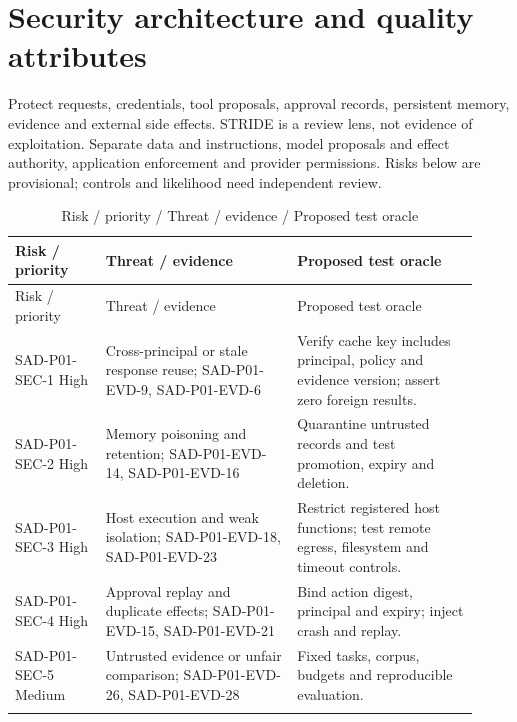 \documentclass[10pt,letterpaper]{article}
\begin{document}
\section{Security architecture and quality attributes}
Protect requests, credentials, tool proposals, approval records, persistent memory, evidence and external side effects. STRIDE is a review lens, not evidence of exploitation. Separate data and instructions, model proposals and effect authority, application enforcement and provider permissions. Risks below are provisional; controls and likelihood need independent review.
\begin{longtable}{@{}>{\raggedright\arraybackslash}p{0.18\linewidth}>{\raggedright\arraybackslash}p{0.38\linewidth}>{\raggedright\arraybackslash}p{0.36\linewidth}@{}}
\caption{Risk / priority / Threat / evidence / Proposed test oracle}\\
\toprule Risk / priority & Threat / evidence & Proposed test oracle\\\midrule\endfirsthead
\toprule Risk / priority & Threat / evidence & Proposed test oracle\\\midrule\endhead
SAD-P01-SEC-1 High & Cross-principal or stale response reuse; SAD-P01-EVD-9, SAD-P01-EVD-6 & Verify cache key includes principal, policy and evidence version; assert zero foreign results.\\\addlinespace
SAD-P01-SEC-2 High & Memory poisoning and retention; SAD-P01-EVD-14, SAD-P01-EVD-16 & Quarantine untrusted records and test promotion, expiry and deletion.\\\addlinespace
SAD-P01-SEC-3 High & Host execution and weak isolation; SAD-P01-EVD-18, SAD-P01-EVD-23 & Restrict registered host functions; test remote egress, filesystem and timeout controls.\\\addlinespace
SAD-P01-SEC-4 High & Approval replay and duplicate effects; SAD-P01-EVD-15, SAD-P01-EVD-21 & Bind action digest, principal and expiry; inject crash and replay.\\\addlinespace
SAD-P01-SEC-5 Medium & Untrusted evidence or unfair comparison; SAD-P01-EVD-26, SAD-P01-EVD-28 & Fixed tasks, corpus, budgets and reproducible evaluation.\\\addlinespace
\bottomrule\end{longtable}
\end{document}
